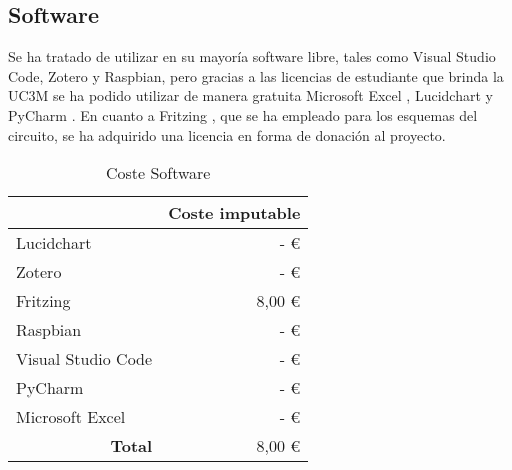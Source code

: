 \subsection{Software}
Se ha tratado de utilizar en su mayoría software libre, tales como Visual Studio Code, Zotero y Raspbian, pero gracias a las licencias de estudiante que brinda la UC3M se ha podido utilizar de manera gratuita Microsoft Excel \cite{microsoft_microsoft_nodate}, Lucidchart \cite{noauthor_usecase_nodate} y PyCharm \cite{noauthor_free_nodate}. En cuanto a Fritzing \cite{noauthor_fritzing_nodate}, que se ha empleado para los esquemas del circuito, se ha adquirido una licencia en forma de donación al proyecto.

\begin{table}[H]
	\centering
	\caption{Coste Software}
	\label{tab:coste_software}
	\begin{tabular}{l|r|}
		\hline
		\rowcolor[HTML]{BFBFBF}
		\multicolumn{1}{|c|}{\cellcolor[HTML]{BFBFBF}\textbf{Descripción}} & \multicolumn{1}{c|}{\cellcolor[HTML]{BFBFBF}\textbf{Coste imputable}} \\ \hline
		\multicolumn{1}{|l|}{Lucidchart}                                   & -   €                                                                 \\ \hline
		\multicolumn{1}{|l|}{Zotero}                                       & -   €                                                                 \\ \hline
		\multicolumn{1}{|l|}{Fritzing}                                     & 8,00 €                                                                \\ \hline
		\multicolumn{1}{|l|}{Raspbian}                                     & -   €                                                                 \\ \hline
		\multicolumn{1}{|l|}{Visual Studio Code}                           & -   €                                                                 \\ \hline
		\multicolumn{1}{|l|}{PyCharm}                                      & -   €                                                                 \\ \hline
		\multicolumn{1}{|l|}{Microsoft Excel}                              & -   €                                                                 \\ \hline
		\multicolumn{1}{r|}{\textbf{Total}}                                & 8,00 €                                                                \\ \cline{2-2}
	\end{tabular}
\end{table}

